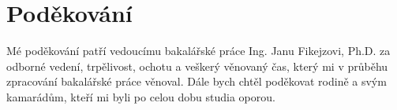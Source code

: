 \clearpage
\vspace*{\fill}
\section*{Poděkování}
Mé poděkování patří vedoucímu bakalářské práce Ing. Janu Fikejzovi, Ph.D. za odborné vedení, trpělivost, ochotu a veškerý věnovaný čas, který mi v průběhu zpracování bakalářské práce věnoval. Dále bych chtěl poděkovat rodině a svým kamarádům, kteří mi byli po celou dobu studia oporou.